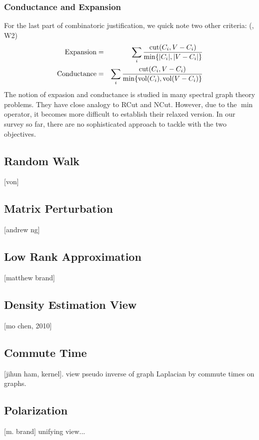 \subsubsection{Conductance and Expansion}
\label{sec:conductance}

For the last part of combinatoric justification, we 
quick note two other criteria: (\cite{lau-2012-spectral-ln}, W2)
\begin{eqnarray}
	\text{Expansion} &=& \sum_{i}{\frac{\text{cut}(C_i,V-C_i)}{\min\{|C_i|,|V-C_i|\}}} \\
	\text{Conductance} &=& \sum_{i}{\frac{\text{cut}(C_i,V-C_i)}{\min\{\text{vol}(C_i),\text{vol}(V-C_i)\}}} 
\end{eqnarray}
The notion of expasion and conductance is studied in 
many spectral graph theory problems. They have close analogy 
to RCut and NCut. However, due to the $ \min $ operator, 
it becomes more difficult to establish their relaxed version. 
In our survey so far, there are no sophisticated approach 
to tackle with the two objectives. 

\subsection{Random Walk}
[von]


\subsection{Matrix Perturbation}
\label{sec:mper}
[andrew ng]

\subsection{Low Rank Approximation}
\label{sec:lrapprox}
[matthew brand]

\subsection{Density Estimation View}
[mo chen, 2010]

\subsection{Commute Time}
[jihun ham, kernel]. 
view pseudo inverse of graph Laplacian by commute times on graphs. 

\subsection{Polarization}
[m. brand] unifying view... 

